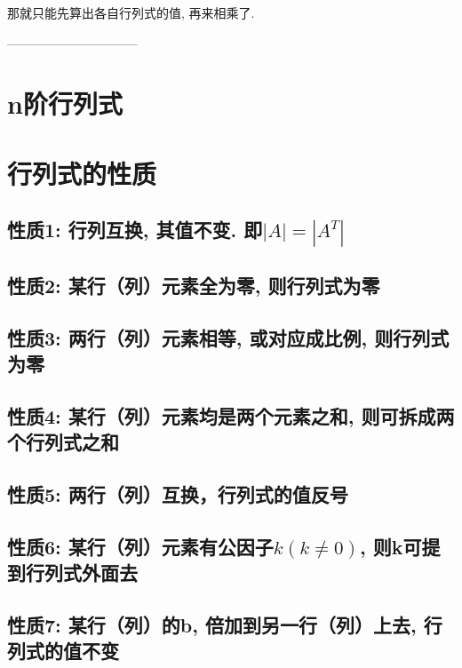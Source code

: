 \documentclass[UTF8]{ctexart}
\begin{document}
那就只能先算出各自行列式的值, 再来相乘了.
	
	
	
	
	\begin{myEnvSample}

	\end{myEnvSample}
	
	
	
	
	--------------------------------
	
	\section{n阶行列式}
	
	
	\section{行列式的性质}
	
	\subsection{性质1: 行列互换, 其值不变. 即$|A|=\left| A^T \right|$}
	
	\subsection{性质2: 某行（列）元素全为零, 则行列式为零}
	
	\subsection{性质3: 两行（列）元素相等, 或对应成比例, 则行列式为零}
	
	\subsection{性质4: 某行（列）元素均是两个元素之和, 则可拆成两个行列式之和}
	
	\subsection{性质5: 两行（列）互换，行列式的值反号}
	
	\subsection{性质6: 某行（列）元素有公因子$k\left( k\ne 0 \right) $, 则k可提到行列式外面去 }
	
	\subsection{性质7: 某行（列）的b, 倍加到另一行（列）上去, 行列式的值不变 }
	
\end{document}
